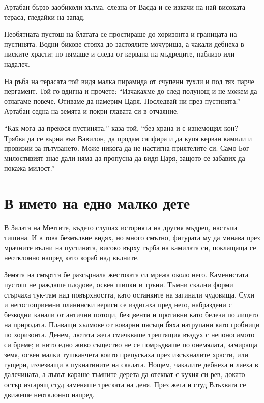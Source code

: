 \documentclass[oneside,10pt]{memoir}
\begin{document}
Артабан бързо заобиколи хълма, слезна от Васда и се изкачи на най-високата
тераса, гледайки на запад.

Необятната пустош на блатата се простираше до хоризонта и границата на
пустинята. Водни бикове стояха до застоялите мочурища, а чакали дебнеха в
ниските храсти; но нямаше и следа от кервана на мъдреците, наблизо или надалеч.

На ръба на терасата той видя малка пирамида от счупени тухли и под тях парче
пергамент. Той го вдигна и прочете: ``Изчакахме до след полунощ и не можем да
отлагаме повече. Отиваме да намерим Царя. Последвай ни през пустинята.'' Артабан
седна на земята и покри главата си в отчаяние.

``Как мога да прекося пустинята,'' каза той, ``без храна и с изнемощял кон?
Трябва да се върна във Вавилон, да продам сапфира и да купя керван камили и
провизии за пътуването. Може никога да не настигна приятелите си. Само Бог
милостивият знае дали няма да пропусна да видя Царя, защото се забавих да покажа
милост.''

\part{В името на едно малко дете}

В Залата на Мечтите, където слушах историята на другия мъдрец, настъпи тишина. И
в това безмълвие видях, но много смътно, фигурата му да минава през мрачните
вълни на пустинята, високо върху гърба на камилата си, поклащаща се неотклонно
напред като кораб над вълните.

Земята на смъртта бе разгърнала жестоката си мрежа около него. Каменистата
пустош не раждаше плодове, освен шипки и тръни. Тъмни скални форми стърчаха
тук-там над повърхността, като останките на загинали чудовища. Сухи и
негостоприемни планински вериги се издигаха пред него, набраздени с безводни
канали от антични потоци, безцвенти и противни като белези по лицето на
природата. Плаващи хълмове от коварни пясъци бяха натрупани като гробници по
хоризонта. Денем, лютата жега смачкваше трептящия въздух с непоносимото си
бреме; и нито едно живо същество не се помръдваше по онемялата, замираща земя,
освен малки тушканчета които препускаха през изсъхналите храсти, или гущери,
изчезващи в пукнатините на скалата. Нощем, чакалите дебнеха и лаеха в
далечината, а лъвът караше тъмните дерета да отекват с кухия си рев, докато
остър изгарящ студ заменяше треската на деня. През жега и студ Влъхвата се
движеше неотклонно напред.
\end{document}
